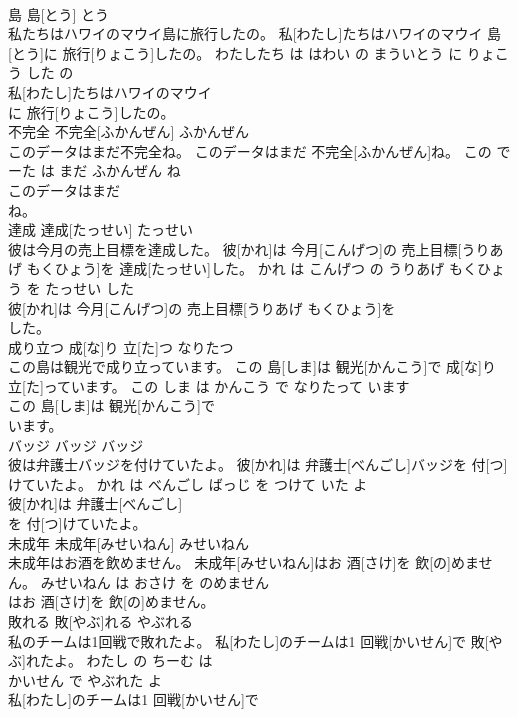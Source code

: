 \documentclass[8pt]{extreport}
\begin{document}
\begin{CJK}{UTF8}{min}
\\	島	島[とう]	とう	
\\	私たちはハワイのマウイ島に旅行したの。	私[わたし]たちはハワイのマウイ 島[とう]に 旅行[りょこう]したの。	わたしたち は はわい の まういとう に りょこう した の	
\\	私[わたし]たちはハワイのマウイ
\\	に 旅行[りょこう]したの。			
\\	不完全	不完全[ふかんぜん]	ふかんぜん	
\\	このデータはまだ不完全ね。	このデータはまだ 不完全[ふかんぜん]ね。	この でーた は まだ ふかんぜん ね	
\\	このデータはまだ
\\	ね。			
\\	達成	達成[たっせい]	たっせい	
\\	彼は今月の売上目標を達成した。	彼[かれ]は 今月[こんげつ]の 売上目標[うりあげ もくひょう]を 達成[たっせい]した。	かれ は こんげつ の うりあげ もくひょう を たっせい した	
\\	彼[かれ]は 今月[こんげつ]の 売上目標[うりあげ もくひょう]を
\\	した。			
\\	成り立つ	成[な]り 立[た]つ	なりたつ	
\\	この島は観光で成り立っています。	この 島[しま]は 観光[かんこう]で 成[な]り 立[た]っています。	この しま は かんこう で なりたって います	
\\	この 島[しま]は 観光[かんこう]で
\\	います。			
\\	バッジ	バッジ	バッジ	
\\	彼は弁護士バッジを付けていたよ。	彼[かれ]は 弁護士[べんごし]バッジを 付[つ]けていたよ。	かれ は べんごし ばっじ を つけて いた よ	
\\	彼[かれ]は 弁護士[べんごし]
\\	を 付[つ]けていたよ。			
\\	未成年	未成年[みせいねん]	みせいねん	
\\	未成年はお酒を飲めません。	未成年[みせいねん]はお 酒[さけ]を 飲[の]めません。	みせいねん は おさけ を のめません	
\\	はお 酒[さけ]を 飲[の]めません。			
\\	敗れる	敗[やぶ]れる	やぶれる	
\\	私のチームは1回戦で敗れたよ。	私[わたし]のチームは1 回戦[かいせん]で 敗[やぶ]れたよ。	わたし の ちーむ は 
\\	かいせん で やぶれた よ	
\\	私[わたし]のチームは1 回戦[かいせん]で

\end{CJK}
\end{document}
